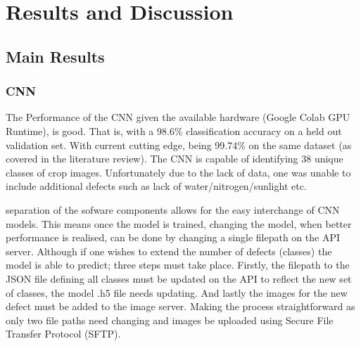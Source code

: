 \chapter{Results and Discussion}
\label{results_discussion}
\section{Main Results}
  \subsection{CNN}
    The Performance of the CNN given the available hardware (Google Colab GPU Runtime), is good. That is, with a 98.6\% classification accuracy on a held out validation set. With current cutting edge, being 99.74\% on the same dataset (as covered in the literature review). The CNN is capable of identifying 38 unique classes of crop images. Unfortunately due to the lack of data, one was unable to include additional defects such as lack of water/nitrogen/sunlight etc.
    \par
    separation of the sofware components allows for the easy interchange of CNN models. This means once the model is trained, changing the model, when better performance is realised, can be done by changing a single filepath on the API server. Although if one wishes to extend the number of defects (classes) the model is able to predict; three steps must take place. Firstly, the filepath to the JSON file defining all classes must be updated on the API to reflect the new set of classes, the model .h5 file needs updating. And lastly the images for the new defect must be added to the image server. Making the process straightforward as only two file paths need changing and images be uploaded using Secure File Transfer Protocol (SFTP).

